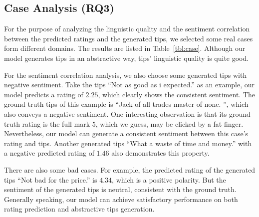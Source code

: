 \documentclass[sigconf]{acmart}
\begin{document}
\subsection{Case Analysis (RQ3)}
\label{sec:exp:case}

For the purpose of analyzing the linguistic quality and the sentiment correlation between the predicted ratings and the generated tips, we selected some real cases form different domains. The results are listed in Table~\ref{tbl:case}.
Although our model generates tips in an abstractive way, tips' linguistic quality is quite good.

For the sentiment correlation analysis, we also choose some generated tips with negative sentiment. Take the tips ``Not as good as i expected.'' as an example, our model predicts a rating of $2.25$, which clearly shows the consistent sentiment. The ground truth tips of this example is ``Jack of all trades master of none. '', which also conveys a negative sentiment. One interesting observation is that its ground truth rating is the full mark $5$, which we guess, may be clicked by a fat finger.
Nevertheless, our model can generate a consistent sentiment between this case's rating and tips. Another generated tips ``What a waste of time and money.'' with a negative predicted rating of $1.46$ also demonstrates this property.

There are also some bad cases. For example, the predicted rating of the generated tips ``Not bad for the price.'' is $4.34$, which is a positive polarity. But the sentiment of the generated tips is neutral, consistent with the ground truth.
Generally speaking, our model can achieve satisfactory performance on both rating prediction and abstractive tips generation.
\end{document}
